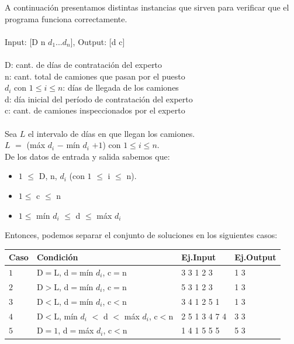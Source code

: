 \documentclass[11pt, a4paper, twoside]{article}
\begin{document}
A continuación presentamos distintas instancias que sirven para verificar que el programa funciona correctamente. \\ 
\\
Input: [D n $d_1$...$d_n$], Output: [d c] \\
\\
D: cant. de días de contratación del experto \\
n: cant.  total de camiones que pasan por el puesto \\
$d_i$ con $1 \le i \le n$: días de llegada de los camiones \\
d: día inicial del período de contratación del experto \\
c: cant. de camiones inspeccionados por el experto \\  
\\
Sea $L$ el intervalo de días en que llegan los camiones. \\
$L$ $=$ (máx $d_i$ $-$ mín $d_i$ $+ 1$) con $1 \le i \le n$. \\

De los datos de entrada y salida sabemos que: 

\begin{itemize}
    \item $1$ $\le$ D, n, $d_i$ (con $1$ $\le$ i $\le$ n).
	\item $1 \le $ c $\le$ n 
	\item $1 \le $ mín $d_i$ $\le$ d $\le$ máx $d_i$ 
\end{itemize}

Entonces, podemos separar el conjunto de soluciones en los siguientes casos: \\

\begin{tabular}{|l|l|l|l|}
	\hline
	Caso &  Condición  						              & Ej.Input      & Ej.Output \\
	\hline
	$1$  &  D$=$L, d$=$mín $d_i$, c$=$n    				  & 3 3 1 2 3     & 1 3 \\	
	$2$  &	D$>$L, d$=$mín $d_i$, c$=$n     		      & 5 3 1 2 3     & 1 3 \\
	\hline	
	$3$  &	D$<$L, d$=$mín $d_i$, c$<$n     			  & 3 4 1 2 5 1   & 1 3 \\
	$4$  &	D$<$L, mín $d_i$ $<$ d $<$ máx $d_i$, c$<$n   & 2 5 1 3 4 7 4 & 3 3 \\
	$5$  &	D$=1$, d$=$máx $d_i$, c$<$n     			  & 1 4 1 5 5 5   & 5 3 \\	
	\hline
\end{tabular} \\
\end{document}
